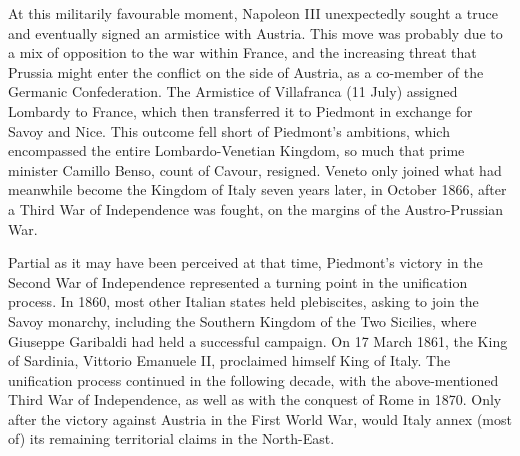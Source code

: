 At this militarily favourable moment, Napoleon III unexpectedly sought a truce and eventually signed an armistice with Austria. 
This move was probably due to a mix of opposition to the war within France, and the increasing threat that Prussia might enter the conflict on the side of Austria, as a co-member of the Germanic Confederation. 
The Armistice of Villafranca (11 July) assigned Lombardy to France, which then transferred it to Piedmont in exchange for Savoy and Nice. 
This outcome fell short of Piedmont's ambitions, which encompassed the entire Lombardo-Venetian Kingdom, so much that prime minister Camillo Benso, count of Cavour, resigned.
Veneto only joined what had meanwhile become the Kingdom of Italy seven years later, in October 1866, after a Third War of Independence was fought, on the margins of the Austro-Prussian War.

Partial as it may have been perceived at that time, Piedmont's victory in the Second War of Independence represented a turning point in the unification process. 
In 1860, most other Italian states held plebiscites, asking to join the Savoy monarchy, including the Southern Kingdom of the Two Sicilies, where Giuseppe Garibaldi had held a successful campaign.
On 17 March 1861, the King of Sardinia, Vittorio Emanuele II, proclaimed himself King of Italy. The unification process continued in the following decade, with the above-mentioned Third War of Independence, as well as with the conquest of Rome in 1870. Only after the victory against Austria in the First World War, would Italy annex (most of) its remaining territorial claims in the North-East. 


